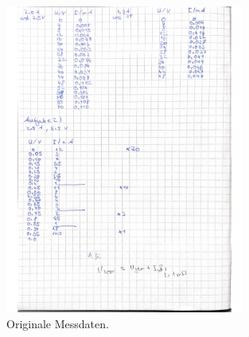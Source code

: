 \begin{figure}[H]
    \centering
    \includegraphics[width=0.7\textwidth]{data/origDaten3.jpg}
    \caption{Originale Messdaten.}
    \label{fig:origDaten3}
\end{figure}